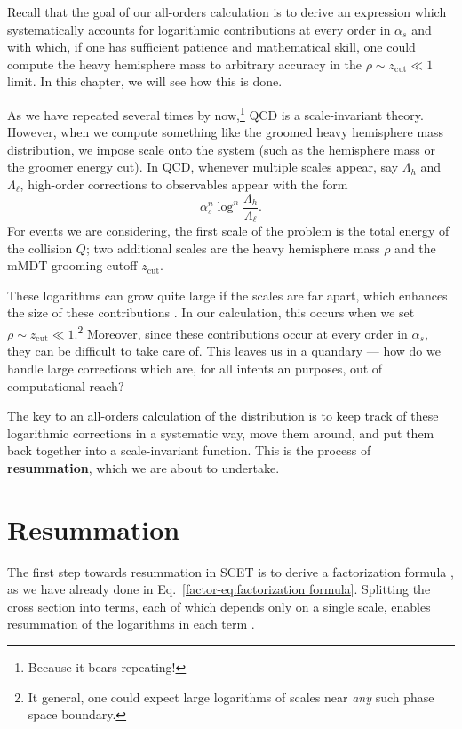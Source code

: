\documentclass[../thesis.tex]{subfiles}
\providecommand{\zcut}{z_\mathrm{{cut}}}
\begin{document}
	Recall that the goal of our all-orders calculation is to derive an expression which systematically accounts for logarithmic contributions at every order in $\alpha_s$ and with which, if one has sufficient patience and mathematical skill, one could compute the heavy hemisphere mass to arbitrary accuracy in the $\rho \sim \zcut \ll 1$ limit. In this chapter, we will see how this is done.

	As we have repeated several times by now,\footnote{Because it bears repeating!} QCD is a scale-invariant theory. However, when we compute something like the groomed heavy hemisphere mass distribution, we impose scale onto the system (such as the hemisphere mass or the groomer energy cut). In QCD, whenever multiple scales appear, say $\Lambda_h$ and $\Lambda_\ell$, high-order corrections to observables appear with the form \cite{becher_introduction_2015-1}
	\begin{equation}
		\alpha_s^n \log^{n}\frac{\Lambda_h}{\Lambda_\ell}.
	\end{equation}
	For events we are considering, the first scale of the problem is the total energy of the collision $Q$; two additional scales are the heavy hemisphere mass $\rho$ and the mMDT grooming cutoff $\zcut$.

	These logarithms can grow quite large if the scales are far apart, which enhances the size of these contributions \cite{schwartz_quantum_2014}. In our calculation, this occurs when we set $\rho \sim \zcut \ll 1$.\footnote{It general, one could expect large logarithms of scales near \textit{any} such phase space boundary.} Moreover, since these contributions occur at every order in $\alpha_s$, they can be difficult to take care of. This leaves us in a quandary --- how do we handle large corrections which are, for all intents an purposes, out of computational reach?

	The key to an all-orders calculation of the distribution is to keep track of these logarithmic corrections in a systematic way, move them around, and put them back together into a scale-invariant function. This is the process of \textbf{resummation}, which we are about to undertake.

\section{Resummation}\label{all-sec:resummation}
	The first step towards resummation in SCET is to derive a factorization formula \cite{becher_introduction_2015-1}, as we have already done in Eq.~\ref{factor-eq:factorization formula}. Splitting the cross section into terms, each of which depends only on a single scale, enables resummation of the logarithms in each term \cite{frye_factorization_2016}.
\end{document}
